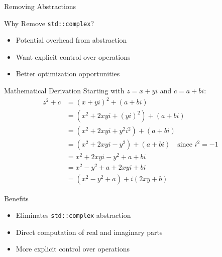 \documentclass{beamer}
\begin{document}
\begin{frame}{Removing Abstractions}
    \begin{block}{Why Remove \texttt{std::complex}?}
        \begin{itemize}
            \item Potential overhead from abstraction
            \item Want explicit control over operations
            \item Better optimization opportunities
        \end{itemize}
    \end{block}
    \begin{block}{Mathematical Derivation}
    \small
    Starting with $z = x + yi$ and $c = a + bi$:
        \[\begin{aligned}
        z^2 + c 
        &= (x + yi)^2 + (a + bi) \\
        &= (x^2 + 2xyi + (yi)^2) + (a + bi) \\
        &= (x^2 + 2xyi + y^2i^2) + (a + bi) \\
        &= (x^2 + 2xyi - y^2) + (a + bi) \quad \text{since } i^2 = -1 \\
        &= x^2 + 2xyi - y^2 + a + bi \\
        &= x^2 - y^2 + a + 2xyi + bi \\
        &= (x^2 - y^2 + a) + i(2xy + b)
        \end{aligned}\]
    \end{block}
    
    \begin{block}{Benefits}
        \begin{itemize}
            \item Eliminates \texttt{std::complex} abstraction
            \item Direct computation of real and imaginary parts
            \item More explicit control over operations
        \end{itemize}
    \end{block}
\end{frame}
\end{document}
